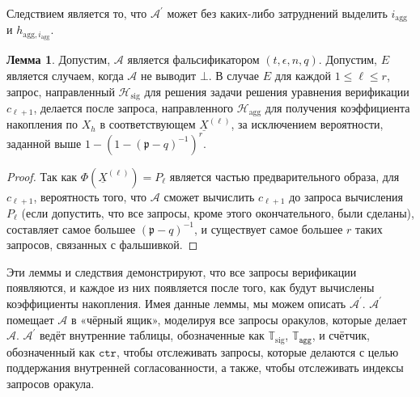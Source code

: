\documentclass{mrl}
\theoremstyle{definition}
\numberwithin{theorem}{subsection}
\newtheorem{lemma}[theorem]{Лемма}
\newcommand{\adversary}{\mathcal{A}}
\newcommand{\p}{\mathfrak{p}}
\begin{document}
Следствием является то, что $\adversary^\prime$ может без каких-либо затруднений выделить $i_{\text{agg}}$ и $h_{\text{agg}, i_{\text{agg}}}$.

\begin{lemma}
Допустим, $\adversary$ является фальсификатором $(t, \epsilon, n, q)$. Допустим, $E$ является случаем, когда $\adversary$ не выводит $\bot$. В случае $E$ для каждой $1 \leq \ell \leq r$, запрос, направленный $\mathcal{H}_{\text{sig}}$ для решения задачи решения уравнения верификации $c_{\ell+1}$, делается после запроса, направленного $\mathcal{H}_{\text{agg}}$ для получения коэффициента накопления по $X_h$ в соответствующем $\underline{X}^{(\ell)}$, за исключением вероятности, заданной выше $1-(1-(\p - q)^{-1})^{r}$.
\end{lemma}
\begin{proof} Так как $\Phi(\underline{X}^{(\ell)}) = P_\ell$ является частью предварительного образа, для $c_{\ell+1}$, вероятность того, что $\adversary$ сможет вычислить $c_{\ell+1}$ до запроса вычисления $P_\ell$ (если допустить, что все запросы, кроме этого окончательного, были сделаны), составляет самое большее $(\p - q)^{-1}$, и существует самое большее $r$ таких запросов, связанных с фальшивкой.
\end{proof}

Эти леммы и следствия демонстрируют, что все запросы верификации появляются, и каждое из них появляется после того, как будут вычислены коэффициенты накопления. Имея данные леммы, мы можем описать $\adversary^\prime$. $\adversary^\prime$ помещает $\adversary$ в «чёрный ящик», моделируя все запросы оракулов, которые делает $\adversary$. $\adversary^\prime$ ведёт внутренние таблицы, обозначенные как $\mathbb{T}_{\text{sig}}$, $\mathbb{T}_{\texttt{agg}}$, и счётчик, обозначенный как $\texttt{ctr}$, чтобы отслеживать запросы, которые делаются с целью поддержания внутренней согласованности, а также, чтобы отслеживать индексы запросов оракула.
\end{document}
